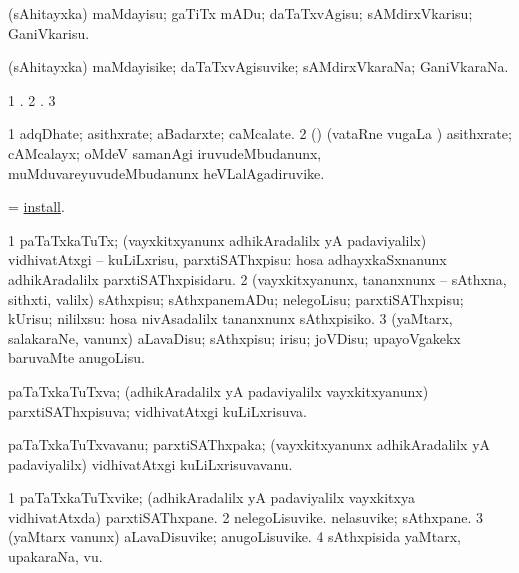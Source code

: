 \bentry
{}
\gl{\sakirx}
\bmng
(sAhitayxka) maMdayisu; gaTiTx mADu; daTaTxvAgisu; sAMdirxVkarisu; GaniVkarisu. 
\emng
\eentry

\bentry
{}
\gl{\nA}
\bmng
(sAhitayxka) maMdayisike; daTaTxvAgisuvike; sAMdirxVkaraNa; GaniVkaraNa. 
\emng
\eentry

\bentry
{}
\gl{\saMkiSx}
\bmng
\bnum
\num{1} . 
\num{2} . 
\num{3}  
\enum
\emng
\eentry

\bentry
{}
\gl{\nA}
\bmng
\bnum
\num{1} adqDhate; asithxrate; aBadarxte; caMcalate. 
\num{2} (\mashA) (vataRne \mo vugaLa \vi) asithxrate; cAMcalayx; oMdeV samanAgi iruvudeMbudanunx, muMduvareyuvudeMbudanunx heVLalAgadiruvike. 
\enum
\emng
\eentry

\bentry
{}
\gl{\sakirx}
\bmng
=  \hyperlink{install}{install}. 
\emng
\eentry

\bentry
{}
\gl{\sakirx}
\bmng
\bnum
\num{1} paTaTxkaTuTx; (vayxkitxyanunx adhikAradalilx yA padaviyalilx) vidhivatAtxgi -- kuLiLxrisu, parxtiSAThxpisu:  hosa adhayxkaSxnanunx adhikAradalilx parxtiSAThxpisidaru. 
\num{2} (vayxkitxyanunx, tananxnunx -- sAthxna, sithxti, \mo valilx) sAthxpisu; sAthxpanemADu; nelegoLisu; parxtiSAThxpisu; kUrisu; nililxsu:  hosa nivAsadalilx tananxnunx sAthxpisiko. 
\num{3} (yaMtarx, salakaraNe, \mo vanunx) aLavaDisu; sAthxpisu; irisu; joVDisu; upayoVgakekx baruvaMte anugoLisu. 
\enum
\emng
\eentry

\bentry
{}
\gl{\gu}
\bmng
paTaTxkaTuTxva; (adhikAradalilx yA padaviyalilx vayxkitxyanunx) parxtiSAThxpisuva; vidhivatAtxgi kuLiLxrisuva. 
\emng
\eentry

\bentry
{}
\gl{\nA}
\bmng
paTaTxkaTuTxvavanu; parxtiSAThxpaka; (vayxkitxyanunx adhikAradalilx yA padaviyalilx) vidhivatAtxgi kuLiLxrisuvavanu. 
\emng
\eentry

\bentry
{}
\gl{\nA}
\bmng
\bnum
\num{1} paTaTxkaTuTxvike; (adhikAradalilx yA padaviyalilx vayxkitxya vidhivatAtxda) parxtiSAThxpane. 
\num{2} nelegoLisuvike. nelasuvike; sAthxpane. 
\num{3} (yaMtarx \mo vanunx) aLavaDisuvike; anugoLisuvike. 
\num{4} sAthxpisida yaMtarx, upakaraNa, \mo vu. 
\enum
\emng
\eentry

